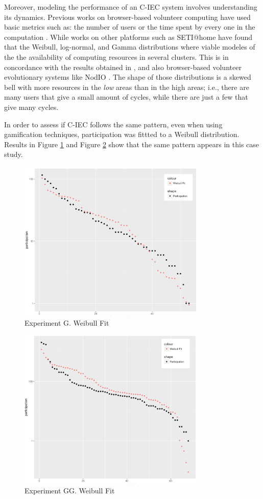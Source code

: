 Moreover, modeling the performance of an C-IEC system
involves understanding its dynamics. Previous works on browser-based
volunteer computing have used basic metrics such as: 
the number of users or the time spent by every one in the
computation \cite{DBLP:journals/gpem/LaredoBGVAGF14, 2016arXiv160101607M}. 
While works on other platforms such as SETI@home
\cite{javadi2009mining} have found that the Weibull, log-normal, and
Gamma distributions where viable modeles of the  
the availability of computing resources in several clusters.
This is in concordance with the results obtained in \cite{agajaj}, and also
browser-based volunteer evolutionary systems like NodIO \cite{DBLP:conf/gecco/MereloCGCRV16}.
The shape of those distributions is a skewed bell
with more resources in the {\em low} areas than in the high areas; i.e., 
there are many users that give a small amount of cycles, while there
are just a few that give many cycles. 

In order to assess if C-IEC follows the same pattern, even when
using gamification techniques, participation was fittted to a 
Weibull distribution. Results in Figure \ref{fig:w2} and Figure \ref{fig:w3}
show that the same pattern appears in this case study. 


\begin{figure}[!t]
    \centering
        \includegraphics[width=3.5in]{img/weibull_2.png}
    \caption{Experiment G. Weibull Fit}
    \label{fig:w2}
\end{figure}
\begin{figure}[!t]
    \centering
        \includegraphics[width=3.5in]{img/weibull_3.png}
    \caption{Experiment GG. Weibull Fit}
    \label{fig:w3}
\end{figure}


